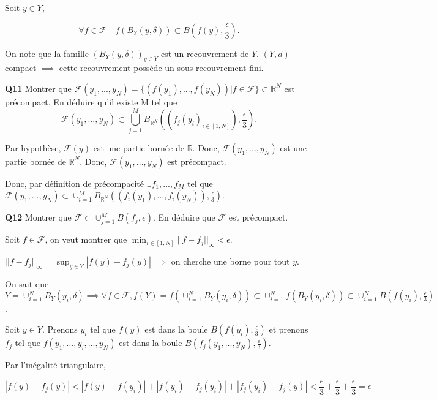 \documentclass[french]{article}
\begin{document}
	Soit $y \in Y$,
	
	\[\forall f \in \mathcal{F} \quad f(B_Y(y, \delta)) \subset B\left(f(y), \frac{\epsilon}{3}\right).\]
	
	On note que la famille $(B_Y(y, \delta))_{y \in Y}$ est un recouvrement de $Y$. $(Y,d)$ compact $\implies$ cette recouvrement possède un sous-recouvrement fini.

	\begin{tcolorbox}[colback=gray!5!white,colframe=gray!75!black]
		\textbf{\large{Q11}} Montrer que $\mathcal{F}(y_1,...,y_N) = \{(f(y_1),...,f(y_N)) | f \in \mathcal{F}\} \subset \mathbb{R}^N$ est précompact. En déduire qu'il existe M tel que
		\[\mathcal{F}(y_1,...,y_N) \subset \bigcup_{j=1}^{M}B_{\mathbb{R}^N}\left((f_j(y_i)_{i\in[1,N]}), \frac{\epsilon}{3}\right).\]
	\end{tcolorbox}

	Par hypothèse, $\mathcal{F}(y)$ est une partie bornée de $\mathbb{R}$.
	Donc, $\mathcal{F}(y_1,...,y_N)$ est une partie bornée de $\mathbb{R}^N$.
	Donc, $\mathcal{F}(y_1,...,y_N)$ est précompact.
	
	Donc, par définition de précompacité $\exists f_1,...,f_M$ tel que $\mathcal{F}(y_1,...,y_N) \subset \cup_{i=1}^{M} B_{\mathbb{R}^N}\left( (f_i(y_1), ... , f_i(y_N)), \frac{\epsilon}{3}\right)$.

	\begin{tcolorbox}[colback=gray!5!white,colframe=gray!75!black]
		\textbf{\large{Q12}} Montrer que $\mathcal{F} \subset \cup_{j=1}^{M} B(f_j, \epsilon)$. En déduire que $\mathcal{F}$ est précompact.
	\end{tcolorbox}

	Soit $f \in \mathcal{F}$, on veut montrer que $\min_{i\in[1,N]} ||f - f_j||_{\infty} < \epsilon$.
	
	$||f - f_j||_{\infty} = \sup_{y \in Y} |f(y) - f_j(y)| \implies $ on cherche une borne pour tout $y$.
	
	On sait que $Y = \cup_{i=1}^{N} B_Y(y_i, \delta) \implies \forall f \in \mathcal{F}, f(Y) = f\left(\cup_{i=1}^N B_Y(y_i, \delta)\right) \subset \cup_{i=1}^N f(B_Y(y_i, \delta)) \subset \cup_{i=1}^N B(f(y_i), \frac{\epsilon}{3})$.
	
	Soit $y \in Y$. Prenons $y_i$ tel que $f(y)$ est dans la boule $B(f(y_i), \frac{\epsilon}{3})$ et prenons $f_j$ tel que $f(y_1,...,y_i,...,y_N)$ est dans la boule $B(f_j(y_1,...,y_N), \frac{\epsilon}{3})$.
	
	Par l'inégalité triangulaire,
	
	\[ |f(y) - f_j(y)| < |f(y) - f(y_i)| + |f(y_i) - f_j(y_i)| + |f_j(y_i) - f_j(y)| < \frac{\epsilon}{3} + \frac{\epsilon}{3} + \frac{\epsilon}{3} = \epsilon\]
	
	
	
\end{document}
